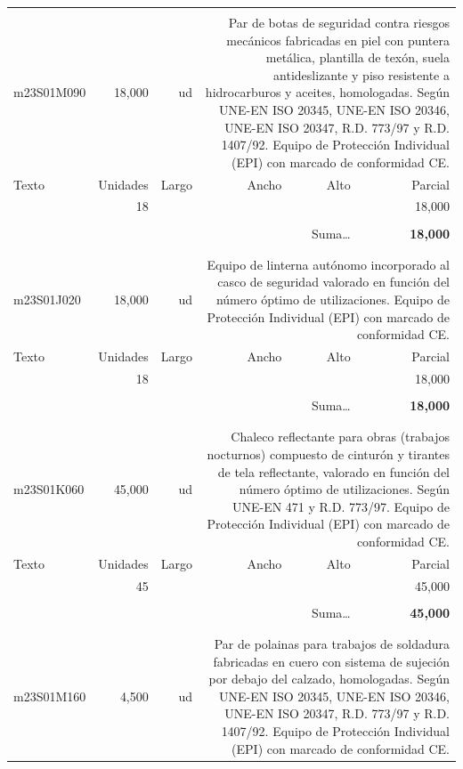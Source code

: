 \documentclass{book}%
\begin{document}
\begin{longtable}{lrrrrr}
&&&&&\\%
m23S01M090&    18,000& ud&\multicolumn{3}{p{6cm}}{\scriptsize Par de botas de seguridad contra riesgos mecánicos fabricadas en piel con puntera metálica, plantilla de texón, suela antideslizante y piso resistente a hidrocarburos y aceites, homologadas. Según UNE-EN ISO 20345, UNE-EN ISO 20346, UNE-EN ISO 20347, R.D. 773/97 y R.D. 1407/92. Equipo de Protección Individual (EPI) con marcado de conformidad CE.\normalsize}\\%
Texto&Unidades&Largo&Ancho&Alto&Parcial\\%
\hline%
\multicolumn{1}{p{3.5cm}}{ }&18&&&&    18,000\\%
&&&&&\\%
\multicolumn{5}{r}{Suma\ldots}&\textbf{    18,000}\\%
\hline%
&&&&&\\%
&&&&&\\%
m23S01J020&    18,000& ud&\multicolumn{3}{p{6cm}}{\scriptsize Equipo de linterna autónomo incorporado al casco de seguridad valorado en función del número óptimo de utilizaciones. Equipo de Protección Individual (EPI) con marcado de conformidad CE.\normalsize}\\%
Texto&Unidades&Largo&Ancho&Alto&Parcial\\%
\hline%
\multicolumn{1}{p{3.5cm}}{ }&18&&&&    18,000\\%
&&&&&\\%
\multicolumn{5}{r}{Suma\ldots}&\textbf{    18,000}\\%
\hline%
&&&&&\\%
&&&&&\\%
m23S01K060&    45,000& ud&\multicolumn{3}{p{6cm}}{\scriptsize Chaleco reflectante para obras (trabajos nocturnos) compuesto de cinturón y tirantes de tela reflectante, valorado en función del número óptimo de utilizaciones. Según UNE-EN 471 y R.D. 773/97. Equipo de Protección Individual (EPI) con marcado de conformidad CE.\normalsize}\\%
Texto&Unidades&Largo&Ancho&Alto&Parcial\\%
\hline%
\multicolumn{1}{p{3.5cm}}{ }&45&&&&    45,000\\%
&&&&&\\%
\multicolumn{5}{r}{Suma\ldots}&\textbf{    45,000}\\%
\hline%
&&&&&\\%
&&&&&\\%
m23S01M160&     4,500& ud&\multicolumn{3}{p{6cm}}{\scriptsize Par de polainas para trabajos de soldadura fabricadas en cuero con sistema de sujeción por debajo del calzado, homologadas. Según UNE-EN ISO 20345, UNE-EN ISO 20346, UNE-EN ISO 20347, R.D. 773/97 y R.D. 1407/92. Equipo de Protección Individual (EPI) con marcado de conformidad CE.\normalsize}\\%

\end{longtable}
\end{document}
